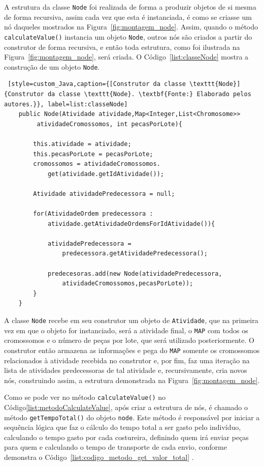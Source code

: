 \par A estrutura da classe \texttt{Node} foi realizada de forma a produzir objetos de si mesma de forma recursiva, assim 
cada vez que esta é instanciada, é como se criasse um nó daqueles mostrados na Figura~\ref{fig:montagem_node}. Assim,
quando o método \texttt{calculateValue()} instancia um objeto \texttt{Node}, outros nós são criados a partir do construtor
de forma recursiva, e então toda estrutura, como foi ilustrada na Figura~\ref{fig:montagem_node}, será criada. 
O Código~\ref{list:classeNode} mostra a construção de um objeto \texttt{Node}.

\begin{lstlisting} [style=custom_Java,caption={[Construtor da classe \texttt{Node}]
{Construtor da classe \texttt{Node}. \textbf{Fonte:} Elaborado pelos autores.}}, label=list:classeNode]
	public Node(Atividade atividade,Map<Integer,List<Chromosome>>
		 atividadeCromossomos, int pecasPorLote){
		
		this.atividade = atividade;
		this.pecasPorLote = pecasPorLote;
		cromossomos = atividadeCromossomos.
			get(atividade.getIdAtividade());
			
		Atividade atividadePredecessora = null;
		
		for(AtividadeOrdem predecessora : 
			atividade.getAtividadeOrdemsForIdAtividade()){
			
			atividadePredecessora = 
				predecessora.getAtividadePredecessora();
		
			predecesoras.add(new Node(atividadePredecessora,
				atividadeCromossomos,pecasPorLote));
		}
	}
\end{lstlisting}

\par A classe \texttt{Node} recebe em seu construtor um objeto de \texttt{Atividade}, que na primeira vez em que o objeto for instanciado,
será a atividade final, o \texttt{MAP} com todos os cromossomos e o número de peças por lote, que será utilizado posteriormente.
O construtor então armazena as informações e pega do \texttt{MAP} somente os cromossomos relacionados à atividade recebida no construtor e, 
por fim, faz uma iteração na lista de atividades predecessoras de tal atividade e, recursivamente, cria novos nós, 
construindo assim, a estrutura demonstrada na Figura~\ref{fig:montagem_node}.

\par Como se pode ver no método \texttt{calculateValue()} no Código\ref{list:metodoCalculateValue}, após criar a estrutura de nós, é chamado o método \texttt{getTempoTotal()} do objeto \texttt{node}. Este método é responsável por iniciar a sequência lógica que 
faz o cálculo do tempo total a ser gasto pelo indivíduo, calculando o tempo gasto por 
cada costureira, definindo quem irá enviar peças para quem e calculando o tempo de transporte 
de cada envio, conforme demonstra o Código~\ref{list:codigo_metodo_get_valor_total} .

